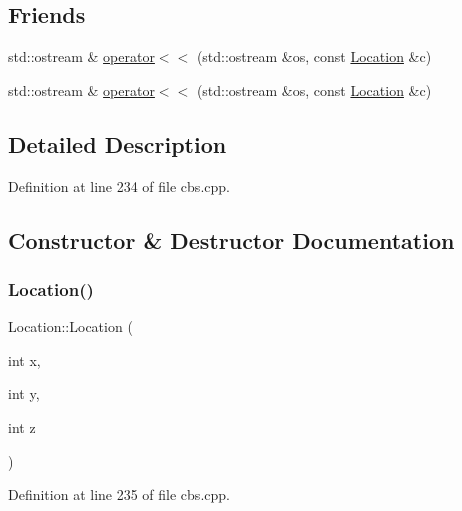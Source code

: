\subsection*{Friends}
\begin{DoxyCompactItemize}
\item 
std\+::ostream \& \hyperlink{struct_location_a80d23d3abaf3e34d1cb5202feb05f385}{operator$<$$<$} (std\+::ostream \&os, const \hyperlink{struct_location}{Location} \&c)
\item 
std\+::ostream \& \hyperlink{struct_location_a80d23d3abaf3e34d1cb5202feb05f385}{operator$<$$<$} (std\+::ostream \&os, const \hyperlink{struct_location}{Location} \&c)
\end{DoxyCompactItemize}


\subsection{Detailed Description}


Definition at line 234 of file cbs.\+cpp.



\subsection{Constructor \& Destructor Documentation}
\mbox{\label{struct_location_ada7ef731cfa1f39a6512b3e6eecf434d}} 
\subsubsection{\texorpdfstring{Location()}{Location()}\hspace{0.1cm}{\footnotesize\ttfamily [1/2]}}
{\footnotesize\ttfamily Location\+::\+Location (\begin{DoxyParamCaption}\item[{int}]{x,  }\item[{int}]{y,  }\item[{int}]{z }\end{DoxyParamCaption})\hspace{0.3cm}{\ttfamily [inline]}}



Definition at line 235 of file cbs.\+cpp.

\mbox{\label{struct_location_ada7ef731cfa1f39a6512b3e6eecf434d}} 
